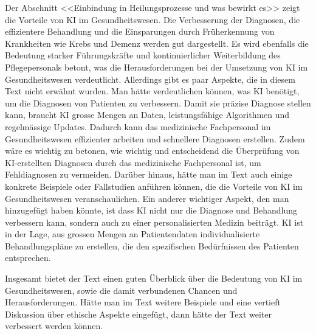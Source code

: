 \documentclass{article}
\begin{document}
{\begin{itemize}
Der Abschnitt <<Einbindung in Heilungsprozesse und was bewirkt es>> zeigt die Vorteile von KI
im Gesundheitswesen. Die Verbesserung der Diagnosen, die effizientere Behandlung und die Einsparungen
durch Früherkennung von Krankheiten wie Krebs und Demenz werden gut dargestellt. Es wird ebenfalls die Bedeutung starker 
Führungskräfte und kontinuierlicher Weiterbildung des Pflegepersonals betont, was die Herausforderungen bei der Umsetzung
von KI im Gesundheitswesen verdeutlicht. Allerdings gibt es paar Aspekte, die in diesem Text nicht erwähnt wurden.
Man hätte verdeutlichen können, was KI benötigt, um die Diagnosen von Patienten zu verbessern. Damit sie präzise Diagnose stellen kann, 
braucht KI grosse Mengen an Daten, leistungsfähige Algorithmen und regelmässige Updates. Dadurch kann das medizinische Fachpersonal im Gesundheitswesen
effizienter arbeiten und schnellere Diagnosen erstellen. Zudem wäre es wichtig zu betonen, wie wichtig und entscheidend die Überprüfung von KI-erstellten Diagnosen
durch das medizinische Fachpersonal ist, um Fehldiagnosen zu vermeiden.  
Darüber hinaus, hätte man im Text auch einige konkrete Beispiele oder Fallstudien anführen können, die die Vorteile von KI im Gesundheitswesen
veranschaulichen. Ein anderer wichtiger Aspekt, den man hinzugefügt haben könnte, ist dass KI nicht nur die Diagnose und Behandlung verbessern kann, sondern
auch zu einer personalisierten Medizin beiträgt. KI ist in der Lage, aus grossen Mengen an Patientendaten individualisierte Behandlungspläne zu erstellen,
die den spezifischen Bedürfnissen des Patienten entsprechen. \citep{clutch}
\end{itemize}

\newpage

Insgesamt bietet der Text einen guten Überblick über die Bedeutung von KI im Gesundheitswesen, sowie die damit verbundenen Chancen und Herausforderungen.
Hätte man im Text weitere Beispiele und eine vertieft Diskussion über ethische Aspekte eingefügt, dann hätte der Text weiter verbessert werden können. 




}





\printbibliography
\end{document}
